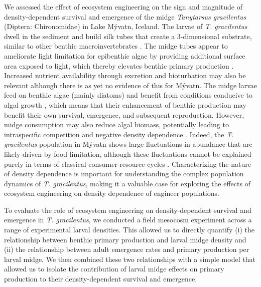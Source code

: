 \documentclass[12pt]{article}
\begin{document}
We assessed the effect of ecosystem engineering on the sign and magnitude
of density-dependent survival and emergence of the midge \textit{Tanytarsus gracilentus} 
(Diptera: Chironomidae) in Lake M\'{y}vatn, Iceland. 
The larvae of \textit{T. gracilentus} dwell in the sediment and build silk tubes that 
create a 3-dimensional substrate, 
similar to other benthic macroinvertebrates 
\citep{largaespada2012,donadi2014,hoelker2015}.
The midge tubes appear to ameliorate light limitation for epibenthic algae by 
providing additional surface area exposed to light,
which thereby elevates benthic primary production 
\citep{herren2017, phillips2019}.
Increased nutrient availability through excretion and bioturbation may also be relevant
\citep{hoelker2015}
although there is as yet no evidence of this for M\'{y}vatn.
The midge larvae feed on benthic algae (mainly diatoms) \citep{ingvason2004} and 
benefit from conditions conducive to algal growth \citep{wetzel2021}, 
which means that their enhancement of benthic production may benefit their own 
survival, emergence, and subsequent reproduction.
However, midge consumption may also reduce algal biomass,
potentially leading to intraspecific competition and negative density dependence 
\citep{einarsson2016}.
Indeed, the \textit{T. gracilentus} population 
in M\'{y}vatn shows large fluctuations in abundance 
that are likely driven by food limitation, although these fluctuations cannot be explained 
purely in terms of classical consumer-resource cycles \citep{ives2008}.
Characterizing the nature of density dependence is important for understanding 
the complex population dynamics of \textit{T. gracilentus},
making it a valuable case for exploring the effects of ecosystem engineering 
on density dependence of engineer populations.

To evaluate the role of ecosystem engineering 
on density-dependent survival and emergence in \textit{T. gracilentus},
we conducted a field mesocosm experiment across a range of experimental larval densities. 
This allowed us to directly quantify
(i) the relationship between benthic primary production and larval midge density and
(ii) the relationship between adult emergence rates and primary production per larval midge.
We then combined these two relationships with a simple model 
that allowed us to isolate the contribution of larval midge effects on 
primary production to their density-dependent survival and emergence.




\end{document}
